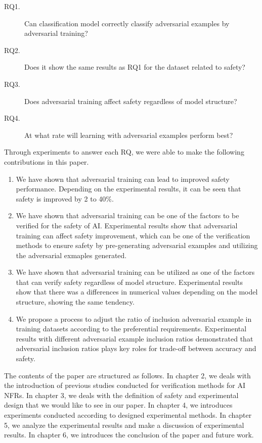 \documentclass[journal,article,submit,moreauthors,pdftex]{Definitions/mdpi}
\begin{document}
\begin{description}
    \item[RQ1.]	Can classification model correctly classify adversarial examples by adversarial training?
    \item[RQ2.]	Does it show the same results as RQ1 for the dataset related to safety?
    \item[RQ3.] Does adversarial training affect safety regardless of model structure?
    \item[RQ4.]	At what rate will learning with adversarial examples perform best?
\end{description}

Through experiments to answer each RQ, we were able to make the following contributions in this paper.

\begin{enumerate}
    \item	We have shown that adversarial training can lead to improved safety performance. Depending on the experimental results, it can be seen that safety is improved by 2 to 40\%.
    \item	We have shown that adversarial training can be one of the factors to be verified for the safety of AI. Experimental results show that adversarial training can affect safety improvement, which can be one of the verification methods to ensure safety by pre-generating adversarial examples and utilizing the adversarial exmaples generated.
    \item   We have shown that adversarial training can be utilized as one of the factors that can verify safety regardless of model structure. Experimental results show that there was a differences in numerical values depending on the model structure, showing the same tendency.
    \item	We propose a process to adjust the ratio of inclusion adversarial example in training datasets according to the preferential requirements. Experimental results with different adversarial example inclusion ratios demonstrated that adversarial inclusion ratios plays key roles for trade-off between accuracy and safety.
\end{enumerate} 

The contents of the paper are structured as follows. In chapter 2, we deals with the introduction of previous studies conducted for verification methods for AI NFRs.
In chapter 3, we deals with the definition of safety and experimental design that we would like to see in our paper.
In chapter 4, we introduces experiments conducted according to designed experimental methods.
In chapter 5, we analyze the experimental results and make a discussion of experimental results.
In chapter 6, we introduces the conclusion of the paper and future work.
\end{document}
